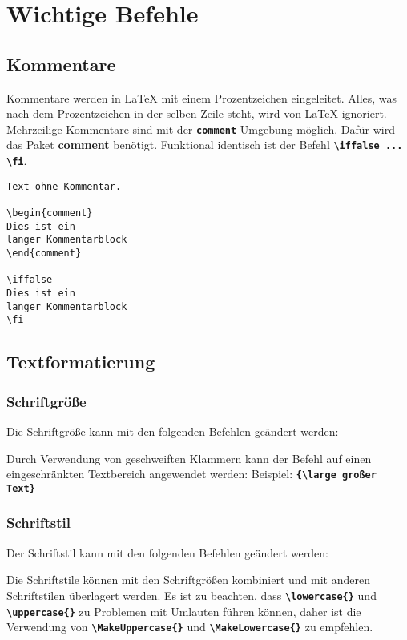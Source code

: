 \newpage
\section{Wichtige Befehle}
\subsection{Kommentare}
Kommentare werden in \LaTeX{} mit einem Prozentzeichen eingeleitet. Alles, was nach dem Prozentzeichen in der selben Zeile steht, wird von \LaTeX{} ignoriert. Mehrzeilige Kommentare sind mit der \texttt{\textbf{comment}}-Umgebung möglich. Dafür wird das Paket \textbf{comment} benötigt. Funktional identisch ist der Befehl \textbf{\texttt{\textbackslash iffalse ... \textbackslash fi}}.

\begin{lstlisting}[language={[LaTeX]TeX}]
% Dies ist ein einzeiliger Kommentar
Text ohne Kommentar.
    
\begin{comment}
Dies ist ein
langer Kommentarblock
\end{comment}

\iffalse
Dies ist ein
langer Kommentarblock
\fi
\end{lstlisting}

\subsection{Textformatierung}
\subsubsection{Schriftgröße}
Die Schriftgröße kann mit den folgenden Befehlen geändert werden:



Durch Verwendung von geschweiften Klammern kann der Befehl auf einen eingeschränkten Textbereich angewendet werden:
Beispiel: \textbf{\texttt{\{\textbackslash large großer Text\}}}

\newpage

\subsubsection{Schriftstil}
Der Schriftstil kann mit den folgenden Befehlen geändert werden:



Die Schriftstile können mit den Schriftgrößen kombiniert und mit anderen Schriftstilen überlagert werden.
Es ist zu beachten, dass \textbf{\texttt{\textbackslash lowercase\{\}}} und \textbf{\texttt{\textbackslash uppercase\{\}}} zu Problemen mit Umlauten führen können, daher ist die Verwendung von \textbf{\texttt{\textbackslash MakeUppercase\{\}}} und \textbf{\texttt{\textbackslash MakeLowercase\{\}}} zu empfehlen.

